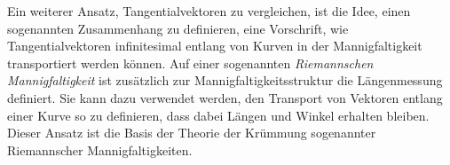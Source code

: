 Ein weiterer Ansatz, Tangentialvektoren zu vergleichen, ist die Idee, 
einen sogenannten Zusammenhang zu definieren, eine Vorschrift, wie
%
%
Tangentialvektoren infinitesimal entlang von Kurven in der Mannigfaltigkeit
transportiert werden können.
Auf einer sogenannten {\em Riemannschen Mannigfaltigkeit} ist zusätzlich
zur Mannigfaltigkeitsstruktur die Längenmessung definiert.
%
%
Sie kann dazu verwendet werden, den Transport von Vektoren entlang einer
Kurve so zu definieren, dass dabei Längen und Winkel erhalten bleiben.
%
Dieser Ansatz ist die Basis der Theorie der Krümmung sogenannter
Riemannscher Mannigfaltigkeiten.
%








